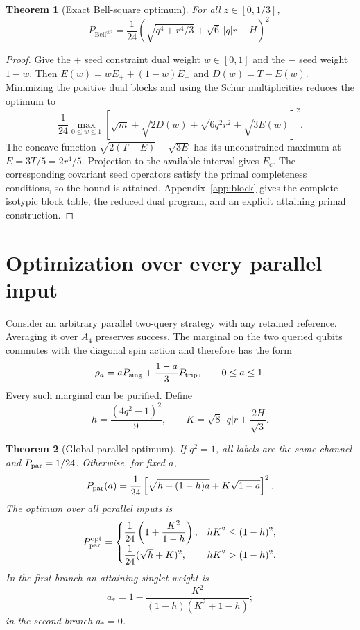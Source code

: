 \documentclass[11pt]{article}
\newtheorem{theorem}{Theorem}[section]
\theoremstyle{definition}
\begin{document}
\begin{theorem}[Exact Bell-square optimum]\label{thm:bell2}
For all $z\in[0,1/3]$,
\begin{equation}\label{eq:bell2}
 P_{\mathrm{Bell}^{\otimes2}}
 =\frac1{24}\left(
 \sqrt{q^4+r^4/3}+\sqrt6\,|q|r+H
 \right)^2.
\end{equation}
\end{theorem}

\begin{proof}
Give the $+$ seed constraint dual weight $w\in[0,1]$ and the $-$ seed weight
$1-w$.  Then
$E(w)=wE_++(1-w)E_-$ and $D(w)=T-E(w)$.  Minimizing the positive dual blocks
and using the Schur multiplicities reduces the optimum to
\[
 \frac1{24}\max_{0\le w\le1}
 \left[\sqrt m+\sqrt{2D(w)}+\sqrt{6q^2r^2}
 +\sqrt{3E(w)}\right]^2.
\]
The concave function $\sqrt{2(T-E)}+\sqrt{3E}$ has its unconstrained maximum
at $E=3T/5=2r^4/5$.  Projection to the available interval gives $E_c$.
The corresponding covariant seed operators satisfy the primal completeness
conditions, so the bound is attained.  Appendix~\ref{app:block} gives the
complete isotypic block table, the reduced dual program, and an explicit
attaining primal construction.
\end{proof}

\section{Optimization over every parallel input}

Consider an arbitrary parallel two-query strategy with any retained
reference.  Averaging it over $A_4$ preserves success.  The marginal on the
two queried qubits commutes with the diagonal spin action and therefore has
the form
\begin{equation}\label{eq:rhoa}
 \rho_a=aP_{\rm sing}+\frac{1-a}{3}P_{\rm trip},
 \qquad 0\le a\le1.
\end{equation}
Every such marginal can be purified.  Define
\[
 h=\frac{(4q^2-1)^2}{9},\qquad
 K=\sqrt8\,|q|r+\frac{2H}{\sqrt3}.
\]

\begin{theorem}[Global parallel optimum]\label{thm:parallel}
If $q^2=1$, all labels are the same channel and $P_{\rm par}=1/24$.
Otherwise, for fixed $a$,
\[
 P_{\rm par}(a)=\frac1{24}
 \left[\sqrt{h+(1-h)a}+K\sqrt{1-a}\right]^2.
\]
The optimum over all parallel inputs is
\begin{equation}\label{eq:parallel}
 P_{\rm par}^{\rm opt}=\begin{cases}
 \dfrac1{24}\left(1+\dfrac{K^2}{1-h}\right),
 &hK^2\le(1-h)^2,\\[6pt]
 \dfrac1{24}(\sqrt h+K)^2,&hK^2>(1-h)^2.
 \end{cases}
\end{equation}
In the first branch an attaining singlet weight is
\[
 a_*=1-\frac{K^2}{(1-h)(K^2+1-h)};
\]
in the second branch $a_*=0$.
\end{theorem}
\end{document}
